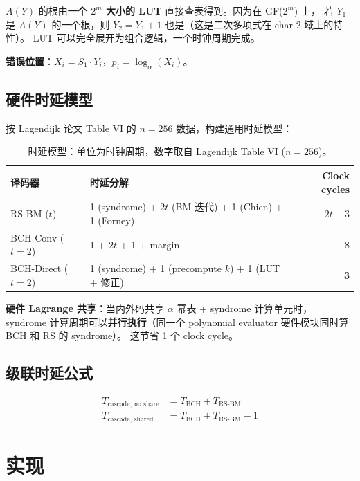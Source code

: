 \documentclass[11pt,a4paper]{article}
\begin{document}
$A(Y)$ 的根由\textbf{一个 $2^m$ 大小的 LUT} 直接查表得到。因为在 GF($2^m$) 上，
若 $Y_1$ 是 $A(Y)$ 的一个根，则 $Y_2 = Y_1 + 1$ 也是（这是二次多项式在 char 2 域上的特性）。
LUT 可以完全展开为组合逻辑，一个时钟周期完成。

\textbf{错误位置}：$X_i = S_1 \cdot Y_i$，$p_i = \log_\alpha(X_i)$。

\subsection{硬件时延模型}

按 Lagendijk 论文 Table VI 的 $n=256$ 数据，构建通用时延模型：

\begin{table}[!ht]
\centering
\begin{tabularx}{\textwidth}{lXr}
\toprule
\textbf{译码器} & \textbf{时延分解} & \textbf{Clock cycles} \\
\midrule
RS-BM ($t$)     & 1 (syndrome) + $2t$ (BM 迭代) + 1 (Chien) + 1 (Forney) & $2t + 3$ \\
BCH-Conv ($t=2$) & 1 + $2t$ + 1 + margin & 8 \\
BCH-Direct ($t=2$) & 1 (syndrome) + 1 (precompute $k$) + 1 (LUT + 修正) & \textbf{3} \\
\bottomrule
\end{tabularx}
\caption{时延模型：单位为时钟周期，数字取自 Lagendijk Table VI ($n=256$)。}
\end{table}

\textbf{硬件 Lagrange 共享}：当内外码共享 $\alpha$ 幂表 + syndrome 计算单元时，
syndrome 计算周期可以\textbf{并行执行}（同一个 polynomial evaluator 硬件模块同时算 BCH 和 RS 的 syndrome）。
这节省 1 个 clock cycle。

\subsection{级联时延公式}

\begin{align}
T_{\text{cascade, no share}} &= T_{\text{BCH}} + T_{\text{RS-BM}} \\
T_{\text{cascade, shared}}   &= T_{\text{BCH}} + T_{\text{RS-BM}} - 1
\end{align}

\section{实现}
\end{document}
